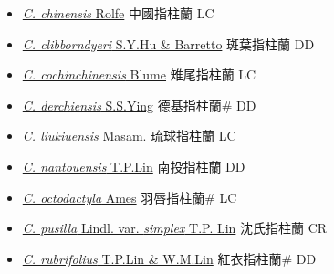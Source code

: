 \begin{itemize}
  \begin{itemize}
        \item[] \href{http://www.theplantlist.org/tpl1.1/search?q=Cheirostylis+chinensis}{\textit{C. chinensis} Rolfe}   中國指柱蘭 LC
        \item[] \href{http://www.theplantlist.org/tpl1.1/search?q=Cheirostylis+clibborndyeri}{\textit{C. clibborndyeri} S.Y.Hu \& Barretto}   斑葉指柱蘭 DD
        \item[] \href{http://www.theplantlist.org/tpl1.1/search?q=Cheirostylis+cochinchinensis}{\textit{C. cochinchinensis} Blume}   雉尾指柱蘭 LC
        \item[] \href{http://www.theplantlist.org/tpl1.1/search?q=Cheirostylis+derchiensis}{\textit{C. derchiensis} S.S.Ying}   德基指柱蘭\# DD
        \item[] \href{http://www.theplantlist.org/tpl1.1/search?q=Cheirostylis+liukiuensis}{\textit{C. liukiuensis} Masam.}   琉球指柱蘭 LC
        \item[] \href{http://www.theplantlist.org/tpl1.1/search?q=Cheirostylis+nantouensis}{\textit{C. nantouensis} T.P.Lin}   南投指柱蘭 DD
        \item[] \href{http://www.theplantlist.org/tpl1.1/search?q=Cheirostylis+octodactyla}{\textit{C. octodactyla} Ames}   羽唇指柱蘭\# LC
        \item[] \href{http://www.theplantlist.org/tpl1.1/search?q=Cheirostylis+pusilla+var.+simplex}{\textit{C. pusilla} Lindl. var. \textit{simplex} T.P. Lin}   沈氏指柱蘭 CR
        \item[] \href{http://www.theplantlist.org/tpl1.1/search?q=Cheirostylis+rubrifolius}{\textit{C. rubrifolius} T.P.Lin \& W.M.Lin}   紅衣指柱蘭\# DD

\end{itemize}
\end{itemize}
